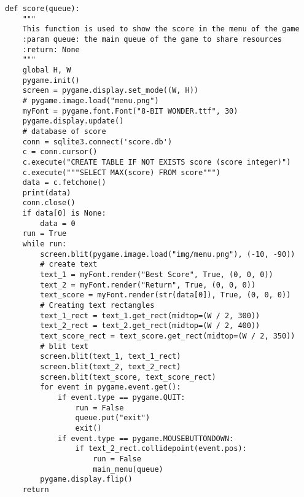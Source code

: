 \documentclass[12pt]{report}			%
\begin{document}
\begin{appendices}
\begin{lstlisting}[title={Program hra.py}, caption={hra.py},  label={lst:hra}]
def score(queue):
    """
    This function is used to show the score in the menu of the game
    :param queue: the main queue of the game to share resources
    :return: None
    """
    global H, W
    pygame.init()
    screen = pygame.display.set_mode((W, H))
    # pygame.image.load("menu.png")
    myFont = pygame.font.Font("8-BIT WONDER.ttf", 30)
    pygame.display.update()
    # database of score
    conn = sqlite3.connect('score.db')
    c = conn.cursor()
    c.execute("CREATE TABLE IF NOT EXISTS score (score integer)")
    c.execute("""SELECT MAX(score) FROM score""")
    data = c.fetchone()
    print(data)
    conn.close()
    if data[0] is None:
        data = 0
    run = True
    while run:
        screen.blit(pygame.image.load("img/menu.png"), (-10, -90))
        # create text
        text_1 = myFont.render("Best Score", True, (0, 0, 0))
        text_2 = myFont.render("Return", True, (0, 0, 0))
        text_score = myFont.render(str(data[0]), True, (0, 0, 0))
        # Creating text rectangles
        text_1_rect = text_1.get_rect(midtop=(W / 2, 300))
        text_2_rect = text_2.get_rect(midtop=(W / 2, 400))
        text_score_rect = text_score.get_rect(midtop=(W / 2, 350))
        # blit text
        screen.blit(text_1, text_1_rect)
        screen.blit(text_2, text_2_rect)
        screen.blit(text_score, text_score_rect)
        for event in pygame.event.get():
            if event.type == pygame.QUIT:
                run = False
                queue.put("exit")
                exit()
            if event.type == pygame.MOUSEBUTTONDOWN:
                if text_2_rect.collidepoint(event.pos):
                    run = False
                    main_menu(queue)
        pygame.display.flip()
    return



\end{lstlisting}
\end{appendices}
\end{document}
